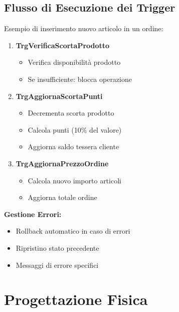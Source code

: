 \documentclass[a4paper,12pt]{article}
\begin{document}
\subsection{Flusso di Esecuzione dei Trigger}
\begin{tcolorbox}[enhanced,breakable,colback=mygray,colframe=myblue,title=Sequenza Operazioni]
Esempio di inserimento nuovo articolo in un ordine:

\begin{enumerate}
    \item \textbf{TrgVerificaScortaProdotto}
        \begin{itemize}
            \item Verifica disponibilità prodotto
            \item Se insufficiente: blocca operazione
        \end{itemize}
    
    \item \textbf{TrgAggiornaScortaPunti}
        \begin{itemize}
            \item Decrementa scorta prodotto
            \item Calcola punti (10\% del valore)
            \item Aggiorna saldo tessera cliente
        \end{itemize}
    
    \item \textbf{TrgAggiornaPrezzoOrdine}
        \begin{itemize}
            \item Calcola nuovo importo articoli
            \item Aggiorna totale ordine
        \end{itemize}
\end{enumerate}

\textbf{Gestione Errori:}
\begin{itemize}
    \item Rollback automatico in caso di errori
    \item Ripristino stato precedente
    \item Messaggi di errore specifici
\end{itemize}
\end{tcolorbox}

\section{Progettazione Fisica}
\end{document}
